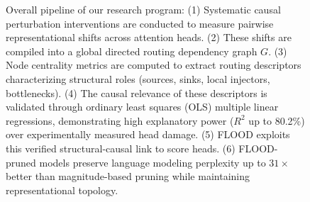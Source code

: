 \documentclass[11pt,a4paper]{article}
\theoremstyle{definition}
\theoremstyle{plain}
\begin{document}
\begin{figure}[t]
\caption{Overall pipeline of our research program: (1) Systematic causal perturbation interventions are conducted to measure pairwise representational shifts across attention heads. (2) These shifts are compiled into a global directed routing dependency graph $G$. (3) Node centrality metrics are computed to extract routing descriptors characterizing structural roles (sources, sinks, local injectors, bottlenecks). (4) The causal relevance of these descriptors is validated through ordinary least squares (OLS) multiple linear regressions, demonstrating high explanatory power ($R^2$ up to 80.2\%) over experimentally measured head damage. (5) FLOOD exploits this verified structural-causal link to score heads. (6) FLOOD-pruned models preserve language modeling perplexity up to $31\times$ better than magnitude-based pruning while maintaining representational topology.}
\label{fig:pipeline}
\end{figure}
\end{document}
